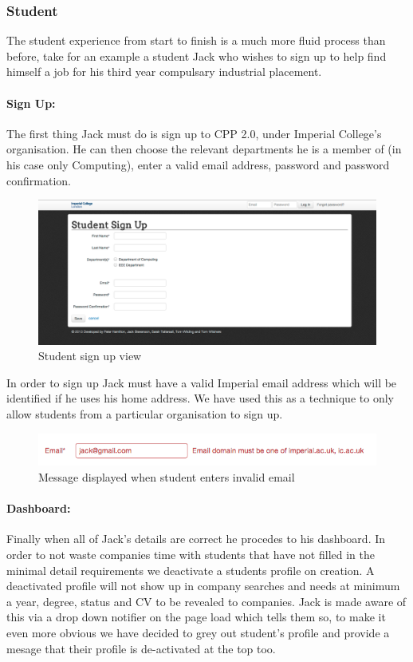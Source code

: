 \subsubsection{Student}
The student experience from start to finish is a much more fluid process than before, take for an example a student Jack who wishes to sign up to help find himself a job for his third year compulsary industrial placement.
  \paragraph{Sign Up:}
    The first thing Jack must do is sign up to CPP 2.0, under Imperial College's organisation. He can then choose the relevant departments he is a member of (in his case only Computing), enter a valid email address, password and password confirmation.

    \begin{figure}[H]\centering
    \includegraphics[scale=0.3]{images/user_experiences/student/sign_up_page}
    \caption{Student sign up view}
    \end{figure}

    In order to sign up Jack must have a valid Imperial email address which will be identified if he uses his home address. We have used this as a technique to only allow students from a particular organisation to sign up.

    \begin{figure}[H]\centering
    \includegraphics[scale=0.5]{images/user_experiences/student/invalid_email}
    \caption{Message displayed when student enters invalid email}
    \end{figure}

  \paragraph{Dashboard:}
    Finally when all of Jack's details are correct he procedes to his dashboard. In order to not waste companies time with students that have not filled in the minimal detail requirements we deactivate a students profile on creation. A deactivated profile will not show up in company searches and needs at minimum a year, degree, status and CV to be revealed to companies. 
    Jack is made aware of this via a drop down notifier on the page load which tells them so, to make it even more obvious we have decided to grey out student's profile and provide a mesage that their profile is de-activated at the top too.


